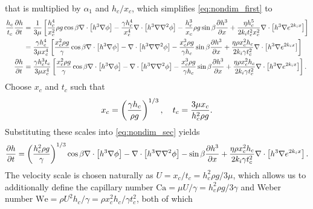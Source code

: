 that is multiplied by $\alpha_1$ and $h_c / x_c$, which simplifies \cref{eq:nondim_first} to 
\begin{align}
    \nonumber \frac{h_c}{t_c} \frac{\partial h}{\partial t} &= \frac{1}{3\mu} \left[ 
        \frac{h_c^4}{x_c^2} \rho g \cos \beta \nabla \cdot \left[ h^3\nabla\phi \right] - 
        \frac{\gamma h_c^4}{x_c^4} \nabla \cdot \left[ h^3 \nabla \nabla^2 \phi \right] - 
        \frac{h_c^3}{x_c} \rho g \sin\beta \frac{\partial h^3}{\partial x} + 
        \frac{\eta h_c^5}{2k_i t_c^2 x_c^2} \nabla \cdot \left[ h^3 \nabla e^{2k_i x} \right]
     \right]\\ 
    \nonumber &= \frac{\gamma h_c^4}{3\mu x_c^4} \left[ 
        \frac{x_c^2 \rho g}{\gamma} \cos \beta \nabla \cdot \left[ h^3\nabla\phi \right] - 
        \nabla \cdot \left[ h^3 \nabla \nabla^2 \phi \right] - 
        \frac{x_c^3 \rho g}{\gamma h_c} \sin\beta \frac{\partial h^3}{\partial x} + 
        \frac{\eta \rho x_c^2 h_c}{2k_i \gamma t_c^2} \nabla \cdot \left[ h^3 \nabla e^{2k_i x} \right]
     \right]\\
    \frac{\partial h}{\partial t} &= \frac{\gamma h_c^3 t_c}{3\mu x_c^4} \left[ 
        \frac{x_c^2 \rho g}{\gamma} \cos \beta \nabla \cdot \left[ h^3\nabla\phi \right] - 
        \nabla \cdot \left[ h^3 \nabla \nabla^2 \phi \right] - 
        \frac{x_c^3 \rho g}{\gamma h_c} \sin\beta \frac{\partial h^3}{\partial x} + 
        \frac{\eta \rho x_c^2 h_c}{2k_i \gamma t_c^2} \nabla \cdot \left[ h^3 \nabla e^{2k_i x} \right]
     \right].
    \label{eq:nondim_sec}
\end{align}
Choose $x_c$ and $t_c$ such that 
\begin{align}
    x_c = \left( \frac{\gamma h_c}{\rho g} \right)^{1/3}, \quad t_c = \frac{3\mu x_c}{h_c^2 \rho g}.
    \label{eq:x_and_t_scales}
\end{align}
Substituting these scales into \cref{eq:nondim_sec} yields
\begin{align}
    \frac{\partial h}{\partial t} = \left( \frac{h_c^2 \rho g}{\gamma} \right)^{1/3} \cos\beta \nabla \cdot \left[  h^3 \nabla \phi  \right] - 
    \nabla \cdot \left[ h^3 \nabla\nabla^2\phi  \right] - 
    \sin\beta \frac{\partial h^3}{\partial x} + 
    \frac{\eta \rho x_c^2 h_c}{2k_i \gamma t_c^2} \nabla \cdot \left[ h^3 \nabla e^{2k_i x} \right].
    \label{eq:nondim_third}
\end{align}  
The velocity scale is chosen naturally as $U = x_c/t_c = h_c^2\rho g/3\mu$,
which allows us to additionally define the capillary number $\mathrm{Ca} = \mu U / \gamma = h_c^2\rho g/3\gamma$
and Weber number $\mathrm{We} = \rho U^2 h_c / \gamma = \rho x_c^2 h_c / \gamma t_c^2$, both of which
